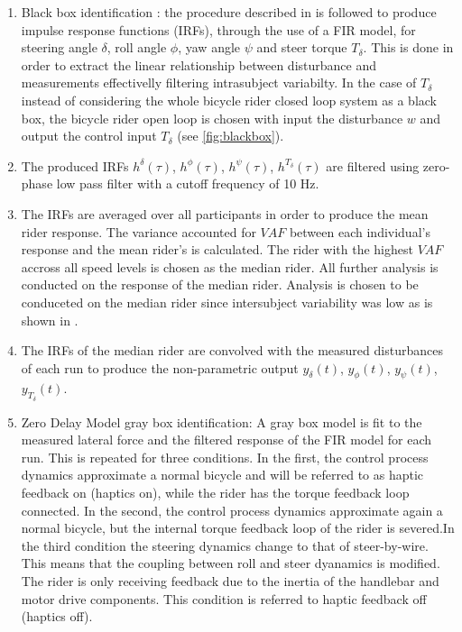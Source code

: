 \begin{enumerate}
    \item Black box identification : the procedure described in \cite{dialynaseffect} is followed to produce impulse response functions (IRFs), through the use of a FIR model, for steering angle \ensuremath{\delta}, roll angle \ensuremath{\phi}, yaw angle \ensuremath{\psi} and steer torque  \ensuremath{T_\delta}. This is done in order to extract the linear relationship between disturbance and measurements effectivelly filtering intrasubject variabilty. In the case of \ensuremath{T_\delta} instead of considering the whole bicycle rider closed loop system as a black box, the bicycle rider open loop is chosen with input the disturbance \ensuremath{w} and output the control input \ensuremath{T_\delta} (see \cref{fig:blackbox}).
    \item The produced IRFs \ensuremath{h^\delta(\tau)}, \ensuremath{h^\phi(\tau)}, \ensuremath{h^\psi(\tau)}, \ensuremath{h^{T_\delta}(\tau)} are filtered using zero-phase low pass filter with a cutoff frequency of 10 \si{\hertz}.
    \item The IRFs are averaged over all participants in order to produce the mean rider response. The variance accounted for \ensuremath{\mathit{VAF}} between each individual's  response and the mean rider's is calculated. The rider with the highest  \ensuremath{\mathit{VAF}}  accross all speed levels  is chosen as the median rider. All further analysis is conducted on the response of the median rider. Analysis is chosen to be conduceted on the median rider since intersubject variability was low as is shown in \cite{dialynaseffect}.
    \item The IRFs of the median rider are convolved with the measured disturbances of each run to produce the non-parametric output \ensuremath{y_\delta(t)}, \ensuremath{y_\phi(t)}, \ensuremath{y_\psi(t)}, \ensuremath{y_{T_\delta}(t)}.
    \item Zero Delay Model gray box identification: A gray box model  is fit to the measured lateral force and the filtered response of the FIR
    model for each run. This is repeated for three conditions. In the first, the control process dynamics approximate a normal bicycle and will be referred to as haptic feedback on (haptics on), while  the rider has the torque feedback loop connected. In the second, the control process dynamics approximate again a normal bicycle, but the internal torque feedback loop of the rider is severed.In the third condition the steering dynamics change to that of steer-by-wire. This means that the coupling between roll and steer dyanamics is modified. The rider is only receiving feedback due to the inertia of the handlebar and motor drive components. This condition is referred to haptic feedback off (haptics off).

\end{enumerate}
